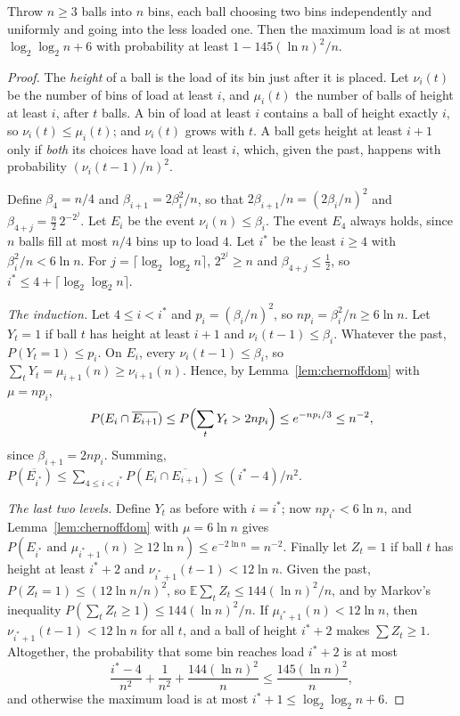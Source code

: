 \begin{theorem}\label{thm:twochoices}
Throw $n\ge3$ balls into $n$ bins, each ball choosing two bins independently and uniformly and going into the less loaded one. Then the maximum load is at most $\log_2\log_2n+6$ with probability at least $1-145(\ln n)^2/n$.
\end{theorem}
\begin{proof}
The \emph{height} of a ball is the load of its bin just after it is placed. Let $\nu_i(t)$ be the number of bins of load at least $i$, and $\mu_i(t)$ the number of balls of height at least $i$, after $t$ balls. A bin of load at least $i$ contains a ball of
height exactly $i$, so $\nu_i(t)\le\mu_i(t)$; and $\nu_i(t)$ grows with $t$. A ball gets height at least $i+1$ only if \emph{both} its choices have load at least $i$, which, given the past, happens with probability $(\nu_i(t-1)/n)^2$.

Define $\beta_4=n/4$ and $\beta_{i+1}=2\beta_i^2/n$, so that $2\beta_{i+1}/n=(2\beta_i/n)^2$ and $\beta_{4+j}=\frac n2\,2^{-2^j}$. Let $E_i$ be the event $\nu_i(n)\le\beta_i$. The event $E_4$ always holds, since $n$ balls fill at most $n/4$ bins up to load $4$. Let $i^*$ be the least
$i\ge4$ with $\beta_i^2/n<6\ln n$. For $j=\lceil\log_2\log_2n\rceil$, $2^{2^j}\ge n$ and $\beta_{4+j}\le\frac12$, so $i^*\le4+\lceil\log_2\log_2n\rceil$.

\emph{The induction.} Let $4\le i<i^*$ and $p_i=(\beta_i/n)^2$, so $np_i=\beta_i^2/n\ge6\ln n$. Let $Y_t=1$ if ball $t$ has height at least $i+1$ and $\nu_i(t-1)\le\beta_i$. Whatever the past, $P(Y_t=1)\le p_i$. On $E_i$, every $\nu_i(t-1)\le\beta_i$, so $\sum_tY_t=\mu_{i+1}(n)\ge\nu_{i+1}(n)$.
Hence, by Lemma~\ref{lem:chernoffdom} with $\mu=np_i$,
\[
P(E_i\cap\overline{E_{i+1}})\le P\Bigl(\sum_tY_t>2np_i\Bigr)\le e^{-np_i/3}\le n^{-2},
\]
since $\beta_{i+1}=2np_i$. Summing, $P(\overline{E_{i^*}})\le\sum_{4\le i<i^*}P(E_i\cap\overline{E_{i+1}})\le(i^*-4)/n^2$.

\emph{The last two levels.} Define $Y_t$ as before with $i=i^*$; now $np_{i^*}<6\ln n$, and Lemma~\ref{lem:chernoffdom} with $\mu=6\ln n$ gives $P(E_{i^*}\text{ and }\mu_{i^*+1}(n)\ge12\ln n)\le e^{-2\ln n}=n^{-2}$. Finally let $Z_t=1$ if ball $t$ has height at least $i^*+2$ and
$\nu_{i^*+1}(t-1)<12\ln n$. Given the past, $P(Z_t=1)\le(12\ln n/n)^2$, so $\mathbb E\sum_tZ_t\le144(\ln n)^2/n$, and by Markov's inequality $P(\sum_tZ_t\ge1)\le144(\ln n)^2/n$. If $\mu_{i^*+1}(n)<12\ln n$, then $\nu_{i^*+1}(t-1)<12\ln n$ for all $t$, and a ball of
height $i^*+2$ makes $\sum Z_t\ge1$. Altogether, the probability that some bin reaches load $i^*+2$ is at most
\[
\frac{i^*-4}{n^2}+\frac1{n^2}+\frac{144(\ln n)^2}n\le\frac{145(\ln n)^2}n,
\]
and otherwise the maximum load is at most $i^*+1\le\log_2\log_2n+6$.
\end{proof}

